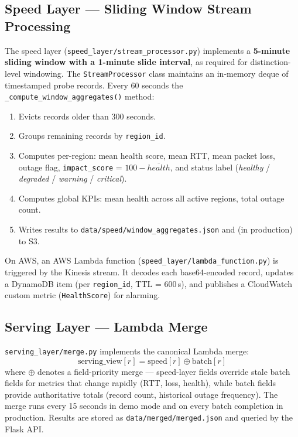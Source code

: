 \documentclass[conference]{IEEEtran}
\begin{document}
\subsection{Speed Layer — Sliding Window Stream Processing}

The speed layer (\texttt{speed\_layer/stream\_processor.py}) implements a
\textbf{5-minute sliding window with a 1-minute slide interval}, as required for
distinction-level windowing. The \texttt{StreamProcessor} class maintains an
in-memory deque of timestamped probe records. Every 60 seconds the
\texttt{\_compute\_window\_aggregates()} method:
\begin{enumerate}
  \item Evicts records older than 300 seconds.
  \item Groups remaining records by \texttt{region\_id}.
  \item Computes per-region: mean health score, mean RTT, mean packet loss, outage flag,
    \texttt{impact\_score} = $100 - \overline{health}$, and status
    label (\textit{healthy} / \textit{degraded} / \textit{warning} / \textit{critical}).
  \item Computes global KPIs: mean health across all active regions, total
    outage count.
  \item Writes results to \texttt{data/speed/window\_aggregates.json} and (in
    production) to S3.
\end{enumerate}

On AWS, an AWS Lambda function (\texttt{speed\_layer/lambda\_function.py})
is triggered by the Kinesis stream. It decodes each base64-encoded record, updates
a DynamoDB item (per \texttt{region\_id}, TTL = 600\,s), and publishes a CloudWatch
custom metric (\texttt{HealthScore}) for alarming.

\subsection{Serving Layer — Lambda Merge}

\texttt{serving\_layer/merge.py} implements the canonical Lambda merge:
\[
  \text{serving\_view}[r] = \text{speed}[r] \oplus \text{batch}[r]
\]
where $\oplus$ denotes a field-priority merge — speed-layer fields override
stale batch fields for metrics that change rapidly (RTT, loss, health), while
batch fields provide authoritative totals (record count, historical outage
frequency). The merge runs every 15 seconds in demo mode and on every batch
completion in production. Results are stored as \texttt{data/merged/merged.json}
and queried by the Flask API.
\end{document}
